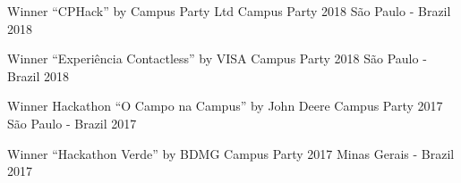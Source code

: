 
\begin{cvhonors}

  \cvhonor
    {Winner} %
    {“CPHack” by Campus Party Ltd} %
    {Campus Party 2018 São Paulo - Brazil} %
    {2018} %

  \cvhonor
    {Winner} %
    {“Experiência Contactless” by VISA} %
    {Campus Party 2018 São Paulo - Brazil} %
    {2018} %


  \cvhonor
    {Winner} %
    {Hackathon “O Campo na Campus” by John Deere} %
    {Campus Party 2017 São Paulo - Brazil} %
    {2017} %

  \cvhonor
    {Winner} %
    {“Hackathon Verde” by BDMG} %
    {Campus Party 2017 Minas Gerais - Brazil} %
    {2017} %

\end{cvhonors}
